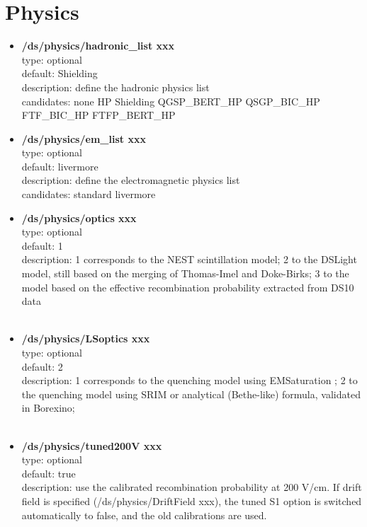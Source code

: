 \documentclass[twocolumn, 10pt]{article}
\begin{document}
\section{Physics}
\begin{itemize}

\item \textbf{/ds/physics/hadronic\_list xxx}\\
type: optional\\
default: Shielding\\
description: define the hadronic physics list\\
candidates: none HP Shielding QGSP\_BERT\_HP QSGP\_BIC\_HP FTF\_BIC\_HP FTFP\_BERT\_HP \\

\item \textbf{/ds/physics/em\_list xxx}\\
type: optional \\
default: livermore\\
description: define the electromagnetic physics list\\
candidates: standard livermore\\

\item \textbf{/ds/physics/optics xxx}\\
type: optional \\
default: 1\\
description: 1 corresponds to the NEST scintillation model; 2 to the DSLight model, still based on the merging of Thomas-Imel and Doke-Birks; 3 to the model based on the effective recombination probability extracted from DS10 data \\\\

\item \textbf{/ds/physics/LSoptics xxx}\\
type: optional \\
default: 2\\
description: 1 corresponds to the quenching model using EMSaturation ; 2 to the quenching model using SRIM or analytical (Bethe-like) formula, validated in Borexino; \\\\

\item \textbf{/ds/physics/tuned200V xxx}\\
type: optional \\
default: true\\
description: use the calibrated recombination probability at 200 V/cm. If drift field is specified (/ds/physics/DriftField xxx), the tuned S1 option is switched automatically to false, and the
old calibrations are used. \\


\end{itemize}
\end{document}

